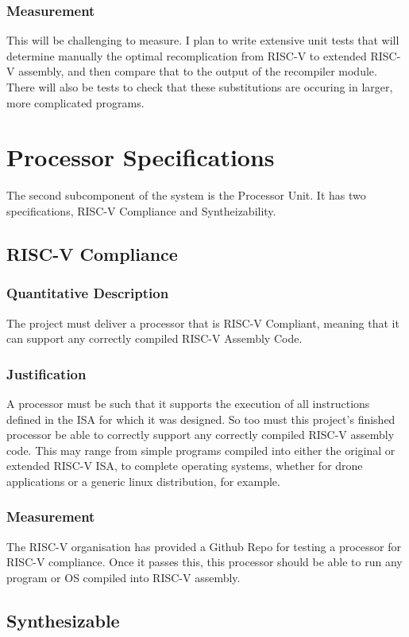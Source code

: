 \subsubsection{Measurement}
This will be challenging to measure. I plan to write extensive unit tests that will determine manually the optimal recomplication from RISC-V to extended RISC-V assembly, and then compare that to the output of the recompiler module. There will also be tests to check that these substitutions are occuring in larger, more complicated programs.

\section{Processor Specifications}
The second subcomponent of the system is the Processor Unit. It has two specifications, RISC-V Compliance and Syntheizability.

\subsection{RISC-V Compliance} \label{subsection:riscvCompliance}
\subsubsection{Quantitative Description}
The project must deliver a processor that is RISC-V Compliant, meaning that it can support any correctly compiled RISC-V Assembly Code.
\subsubsection{Justification}
A processor must be such that it supports the execution of all instructions defined in the \ac{ISA} for which it was designed. So too must this project's finished processor be able to correctly support any correctly compiled RISC-V assembly code. This may range from simple programs compiled into either the original or extended RISC-V \ac{ISA}, to complete operating systems, whether for drone applications or a generic linux distribution, for example. 
\subsubsection{Measurement}
The RISC-V organisation has provided a Github Repo for testing a processor for RISC-V compliance.\cite{Compliance} Once it passes this, this processor should be able to run any program or OS compiled into RISC-V assembly.

\subsection{Synthesizable}
